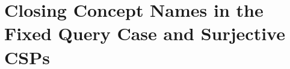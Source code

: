 \documentclass{lmcs}
\theoremstyle{definition}
\begin{document}




\section{Closing Concept Names in the Fixed Query Case and Surjective CSPs}
\label{sect:closingconcepts}

\end{document}
